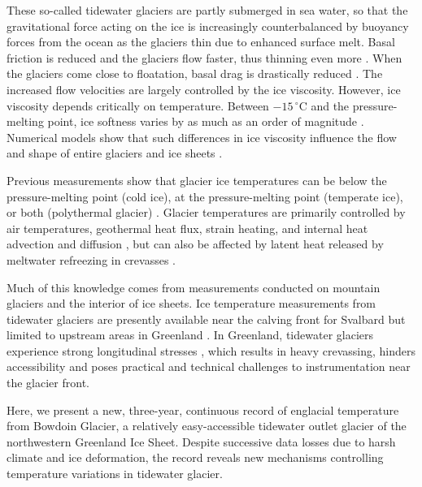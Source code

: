 \documentclass[utf8]{article}
\begin{document}
    These so-called tidewater glaciers are partly submerged in sea water, so
    that the gravitational force acting on the ice is increasingly
    counterbalanced by buoyancy forces from the ocean as the glaciers
    thin due to enhanced surface melt. Basal friction is
    reduced and the glaciers flow faster, thus thinning even more
    \citep{Meier.Post.1987}. When the glaciers come close to floatation, basal
    drag is drastically reduced \citep{Shapero.etal.2016, Seddik.etal.2019}.
    The increased flow velocities are largely controlled by the ice viscosity.
    However, ice viscosity depends critically on temperature. Between
    $-15\,^\circ$C and the pressure-melting point, ice softness varies by as
    much as an order of magnitude \citep[p.~72]{Cuffey.Paterson.2010}.
    Numerical models show that such differences
    in ice viscosity influence the flow and shape of entire
    glaciers and ice sheets \citep[e.g.,][Figs.~2 and~7]{Seguinot.etal.2016}.

    Previous measurements show that glacier ice temperatures can be below
    the pressure-melting point (cold ice), at the pressure-melting point
    (temperate ice), or both (polythermal glacier)
    \citep[p.~399]{Ahlmann.1935, Cuffey.Paterson.2010}. Glacier temperatures
    are primarily controlled by air temperatures, geothermal heat flux, strain
    heating, and internal heat advection and diffusion \citep{Q-Robin.1955},
    but can also be affected by latent heat released by meltwater refreezing in
    crevasses \citep{Phillips.etal.2010, Phillips.etal.2013, Luthi.etal.2015}.

    Much of this knowledge comes from measurements conducted on mountain
    glaciers and the interior of ice sheets. Ice temperature measurements from
    tidewater glaciers are presently available near the calving front for
    Svalbard \citep{Jania.etal.1996} but limited to upstream areas in Greenland
    \citep{Iken.etal.1993, Luthi.etal.2002, Luthi.etal.2015, Doyle.etal.2018}.
    In Greenland, tidewater glaciers experience strong longitudinal stresses
    \citep[e.g.,][]{Fastook.etal.1995}, which results in heavy crevassing,
    hinders accessibility and poses practical and technical challenges to
    instrumentation near the glacier front.

    Here, we present a new, three-year, continuous record of englacial
    temperature from Bowdoin Glacier, a relatively easy-accessible tidewater
    outlet
    glacier of the northwestern Greenland Ice Sheet. Despite successive data
    losses due to harsh climate and ice deformation, the record reveals
    new mechanisms controlling temperature variations in tidewater glacier.
\end{document}
